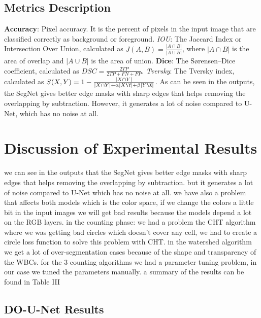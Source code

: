 \documentclass[conference]{IEEEtran}
\begin{document}
\subsection{Metrics Description}
\textbf{Accuracy}: Pixel accuracy. It is the percent of pixels in the input image that are classified correctly as background or foreground.
\textit{IOU}: The Jaccard Index or Intersection Over Union, calculated as $J(A, B) = \frac{|A \cap B|}{|A \cup B|}$, where $|A \cap B|$ is the area of overlap and $|A \cup B|$ is the area of union.
\textbf{Dice}: The Sørensen–Dice coefficient, calculated as $DSC = \frac{2TP}{2TP + FN + FP}$.
\textit{Tversky}: The Tversky index, calculated as $S(X, Y) = 1 - \frac{|X \cap Y|}{|X \cap Y| + \alpha|X\Y| + \beta|Y\X|}$.
As can be seen in the outputs, the SegNet gives better edge masks with sharp edges that helps removing the overlapping by subtraction. However, it generates a lot of noise compared to U-Net, which has no noise at all.

\section{Discussion of Experimental Results}
we can see in the outputs that the SegNet gives better edge masks with sharp edges that helps removing the overlapping by subtraction. but it generates a lot of noise compared to U-Net which has no noise at all.
we have also a problem that affects both models which is the color space, if we change the colors a little bit in the input images we will get bad results because the models depend a lot on the RGB layers.
in the counting phase: we had a problem the CHT algorithm where we was getting bad circles which doesn’t cover any cell, we had to create a circle loss function to solve this problem with CHT. in the watershed algorithm we get a lot of over-segmentation cases because of the shape and transparency of the WBCs. for the 3 counting algorithms we had a parameter tuning problem, in our case we tuned the parameters manually. a summary of the results can be found in Table III
\subsection{DO-U-Net Results}
\end{document}
